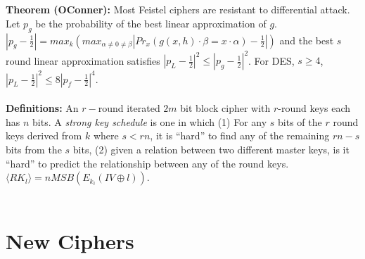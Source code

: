 \\
\\
{\bf Theorem (OConner):} Most Feistel ciphers are resistant to differential attack.  Let
$p_g$ be the probability of the best linear approximation of $g$.
$|p_g - {\frac 1 2}| = max_k (max_{\alpha \ne 0 \ne \beta} | Pr_x(g(x,h) \cdot \beta 
= x \cdot \alpha)- {\frac 1 2}|)$ and the best $s$ round linear approximation
satisfies $|p_L -{\frac 1 2}|^2 \le |p_g - {\frac 1 2}|^2$.  For DES, $s \ge 4$,
$|p_L - {\frac 1 2}|^2 \le 8|p_f -{\frac 1 2}|^4$.
\\
\\
{\bf Definitions:}
An $r-$round iterated $2m$ bit block cipher with $r$-round keys each has
$n$ bits.  A \emph{strong key schedule} is one in which
(1) For any $s$ bits of the $r$ round keys derived from $k$ where $s<rn$, it is ``hard''
to find any of the remaining $rn-s$ bits from the $s$ bits, (2) given a relation between
two different master keys, is it ``hard'' to predict the relationship between any of the 
round keys.  $\langle RK_l \rangle= n MSB(E_{k_i}(IV \oplus l))$.
\\
\\
\section{New Ciphers}
